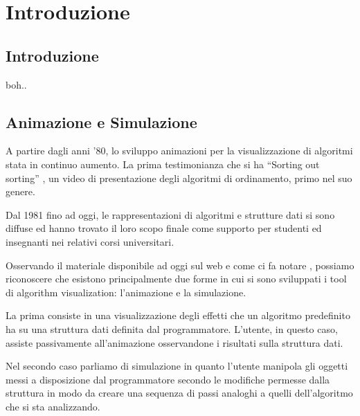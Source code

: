 
\label{capitolo1}\chapter{Introduzione}


\section{Introduzione}

boh..


\section{Animazione e Simulazione}

A partire dagli anni '80, lo sviluppo animazioni per la visualizzazione
di algoritmi stata in continuo aumento. La prima testimonianza che
si ha {}``Sorting out sorting'' \cite{video}, un video di presentazione
degli algoritmi di ordinamento, primo nel suo genere.

Dal 1981 fino ad oggi, le rappresentazioni di algoritmi e strutture
dati si sono diffuse ed hanno trovato il loro scopo finale come supporto
per studenti ed insegnanti nei relativi corsi universitari.

Osservando il materiale disponibile ad oggi sul web e come ci fa notare
\cite{MatrixPro}, possiamo riconoscere che esistono principalmente
due forme in cui si sono sviluppati i tool di algorithm visualization:
l'animazione e la simulazione.

La prima consiste in una visualizzazione degli effetti che un algoritmo
predefinito ha su una struttura dati definita dal programmatore. L'utente,
in questo caso, assiste passivamente all'animazione osservandone i
risultati sulla struttura dati.

Nel secondo caso parliamo di simulazione in quanto l'utente manipola
gli oggetti messi a disposizione dal programmatore secondo le modifiche
permesse dalla struttura in modo da creare una sequenza di passi analoghi
a quelli dell'algoritmo che si sta analizzando.

